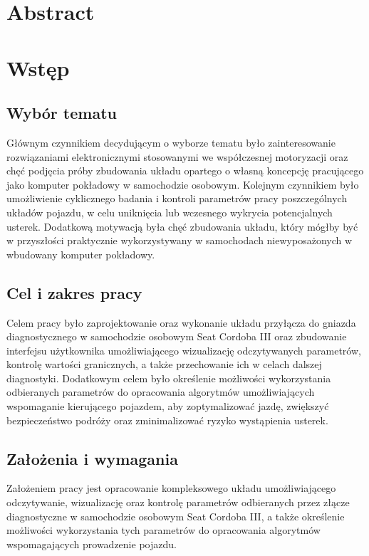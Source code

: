 \documentclass[12pt]{article} %
\numberwithin{equation}{subsection}
\numberwithin{figure}{section}
\numberwithin{table}{section}
\begin{document}
\section*{Abstract}
\thispagestyle{empty}
\vspace{0.5cm}
\hspace{0.5cm}

\newpage

\section{Wstęp}

	\subsection{Wybór tematu}
		\hspace{0.5cm}Głównym czynnikiem decydującym o wyborze tematu było zainteresowanie rozwiązaniami elektronicznymi stosowanymi we współczesnej motoryzacji oraz chęć podjęcia próby zbudowania układu opartego o własną koncepcję pracującego jako komputer pokładowy w samochodzie osobowym. Kolejnym czynnikiem było umożliwienie cyklicznego badania i kontroli parametrów pracy poszczególnych układów pojazdu, w celu uniknięcia lub wczesnego wykrycia potencjalnych usterek. Dodatkową motywacją była chęć zbudowania układu, który mógłby być w przyszłości praktycznie wykorzystywany w samochodach niewyposażonych w wbudowany komputer pokładowy. 	
	
	\subsection{Cel i zakres pracy}
		\hspace{0.5cm}Celem pracy było zaprojektowanie oraz wykonanie układu przyłącza do gniazda diagnostycznego w samochodzie osobowym Seat Cordoba III oraz zbudowanie interfejsu użytkownika umożliwiającego wizualizację odczytywanych parametrów, kontrolę wartości granicznych, a także przechowanie ich w celach dalszej diagnostyki. Dodatkowym celem było określenie możliwości wykorzystania odbieranych parametrów do opracowania algorytmów umożliwiających wspomaganie kierującego pojazdem, aby zoptymalizować jazdę, zwiększyć bezpieczeństwo podróży oraz zminimalizować ryzyko wystąpienia usterek. 
	
	\subsection{Założenia i wymagania}
		\hspace{0.5cm}Założeniem pracy jest opracowanie kompleksowego układu umożliwiającego odczytywanie, wizualizację oraz kontrolę parametrów odbieranych przez złącze diagnostyczne w samochodzie osobowym Seat Cordoba III, a także określenie możliwości wykorzystania tych parametrów do opracowania algorytmów wspomagających prowadzenie pojazdu.
	
\end{document}
